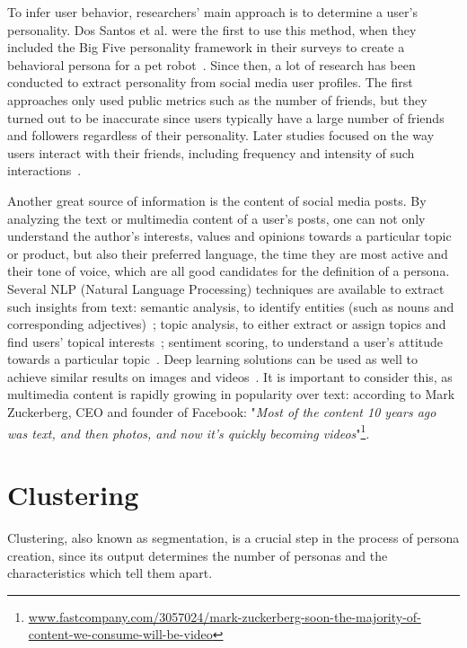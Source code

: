 To infer user behavior, researchers' main approach is to determine a user's personality. Dos Santos et al. were the first to use this method, when they included the Big Five personality framework in their surveys to create a behavioral persona for a pet robot~\cite{dos2014behavioral}. Since then, a lot of research has been conducted to extract personality from social media user profiles. The first approaches only used public metrics such as the number of friends, but they turned out to be inaccurate since users typically have a large number of friends and followers regardless of their personality. Later studies focused on the way users interact with their friends, including frequency and intensity of such interactions~\cite{adali2012predicting, golbeck2011predicting}.

Another great source of information is the content of social media posts. By analyzing the text or multimedia content of a user's posts, one can not only understand the author's interests, values and opinions towards a particular topic or product, but also their preferred language, the time they are most active and their tone of voice, which are all good candidates for the definition of a persona. Several NLP (Natural Language Processing) techniques are available to extract such insights from text: semantic analysis, to identify entities (such as nouns and corresponding adjectives)~\cite{maulud2021state}; topic analysis, to either extract or assign topics and find users' topical interests~\cite{huang2013sentiment}; sentiment scoring, to understand a user's attitude towards a particular topic~\cite{neri2012sentiment, huang2013sentiment}. Deep learning solutions can be used as well to achieve similar results on images and videos~\cite{rodriguez2020personality}. It is important to consider this, as multimedia content is rapidly growing in popularity over text: according to Mark Zuckerberg, CEO and founder of Facebook: "\textit{Most of the content 10 years ago was text, and then photos, and now it’s quickly becoming videos}"\footnote{\url{www.fastcompany.com/3057024/mark-zuckerberg-soon-the-majority-of-content-we-consume-will-be-video}}.

\section{Clustering}
\label{sec:clustering}
Clustering, also known as segmentation, is a crucial step in the process of persona creation, since its output determines the number of personas and the characteristics which tell them apart.

